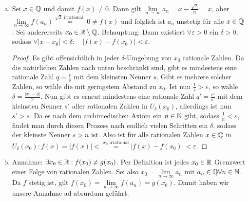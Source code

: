 \documentclass{article}
\newcommand{\mylim}{\lim\limits_{n\to \infty}}
\renewcommand{\epsilon}{\varepsilon}
\begin{document}
\begin{enumerate}[(a)]
\begin{proof}
            Es gilt $\frac{2}{2-4} = -1 = 2\cdot 2 - 5$. Daher ist $f$ im Intervall $(1,3)$ durch die rationale Funktion $\frac{x}{x-4}$ definiert. Da $x \neq 4$ ist $f$ in diesem Intervall, also insbesonder an der Stelle $x = 2$ ebenfalls stetig.
            Außerdem gilt $\frac{5}{5-4} = 5 = 2\cdot 5 - 5$ und daher muss nach analoger Argumentation $f$ an der Stelle $x = 5$ stetig sein. 
            An der Stelle $x = 4$ gibt es eine wesentliche Unstetigkeitsstelle. Für alle $n \in \N\setminus\{2,4,5\}$ definiere die Folge $(a_{n, k})_{k \in \N}$ durch $a_{n, k} = n - \frac{\sqrt{2}}{k}$. Dann gilt $\lim\limits_{k \to \infty} a_{n, k} = n$ und $\lim\limits_{k\to \infty} f(a_{n,k}) = \frac{n}{n-4}$. Allerdings ist $\forall n \in \N\setminus\{2,4,5\} \frac{4}{n-4} \neq 2n - 5$. Folglich ist $f$ $\forall n \in \N\setminus\{2,4,5\}$ unstetig. 
        \end{proof}
        \item Sei $x\in \mathbb{Q}$ und damit $f(x) \neq 0$. Dann gilt $\mylim a_n = x - \frac{\sqrt{2}}{n} = x$, aber $\mylim f(a_n) \overset{\sqrt{2} \text{ irrational }}{=} 0\neq f(x)$ und folglich ist $a_n$ unstetig für alle $x\in \mathbb{Q}$.
        Sei andererseits $x_0\in \mathbb{R}\setminus \mathbb{Q}$. Behauptung: Dann existiert $\forall \epsilon > 0$ ein $\delta > 0$, sodass $\forall |x -x_0| < \delta:\quad |f(x) - f(x_0)| < \epsilon$.
        \begin{proof}
            Es gibt offensichtlich in jeder $\delta$-Umgebung von $x_0$ rationale Zahlen. Da die natürlichen Zahlen nach unten beschränkt sind, gibt es mindestens eine rationale Zahl $q = \frac{r}{s}$ mit dem kleinsten Nenner $s$. Gibt es mehrere solcher Zahlen, so wähle die mit geringstem Abstand zu $x_0$. Ist nun $\frac{1}{s} > \epsilon$, so wähle $\delta = \frac{|x_0 - q|}{2}$. Nun gibt es erneut mindestens eine rationale Zahl $q' = \frac{r'}{s'}$ mit dem kleinsten Nenner $s'$ aller rationalen Zahlen in $U_\delta(x_0)$, allerdings ist nun $s'>s$. Da es nach dem archimedischen Axiom ein $n\in \mathbb{N}$ gibt, sodass $\frac{1}{n} < \epsilon$, findet man durch diesen Prozess nach endlich vielen Schritten ein $\delta$, sodass der kleinste Nenner $s > n$ ist. Also ist für alle rationalen Zahlen $x\in \mathbb{Q}$ in $U_\delta(x_0): f(x) = |f(x)| < \overset{x_0\text{ irrational}}{=} |f(x) - f(x_0)| < \epsilon$.
        \end{proof}
        \item Annahme: $\exists x_0 \in \mathbb{R}: f(x_0)\neq g(x_0)$.
        Per Definition ist jedes $x_0 \in \mathbb{R}$ Grenzwert einer Folge von rationalen Zahlen. Sei also $x_0 = \mylim a_n$ mit $a_n \in \mathbb{Q} \forall n\in \mathbb{N}$. Da $f$ stetig ist, gilt $f(x_0) = \mylim f(a_n) = g(x_0)$. Damit haben wir unsere Annahme ad absurdum geführt.
    \end{enumerate}
\end{document}
